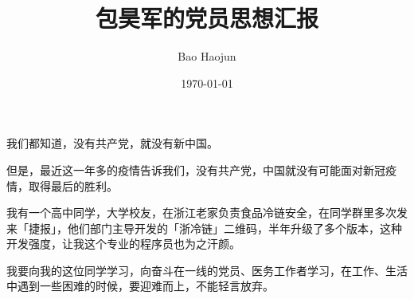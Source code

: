 \documentclass[11pt,dvipdfmx,CJKbookmarks]{article}
\date{\today}
\begin{document}
\begin{CJK*}{UTF8}{simsun}

\title{\thinspace 包昊军的党员思想汇报}
\author{Bao Haojun}

\maketitle
我们都知道，没有共产党，就没有新中国。

但是，最近这一年多的疫情告诉我们，没有共产党，中国就没有可能面对新冠疫情，取得最后的胜利。

我有一个高中同学，大学校友，在浙江老家负责食品冷链安全，在同学群里多次发来「捷报」，他们部门主导开发的「浙冷链」二维码，半年升级了\thinspace 多个版本，这种开发强度，让我这个专业的程序员也为之汗颜。

我要向我的这位同学学习，向奋斗在一线的党员、医务工作者学习，在工作、生活中遇到一些困难的时候，要迎难而上，不能轻言放弃。
\end{CJK*}
\end{document}
